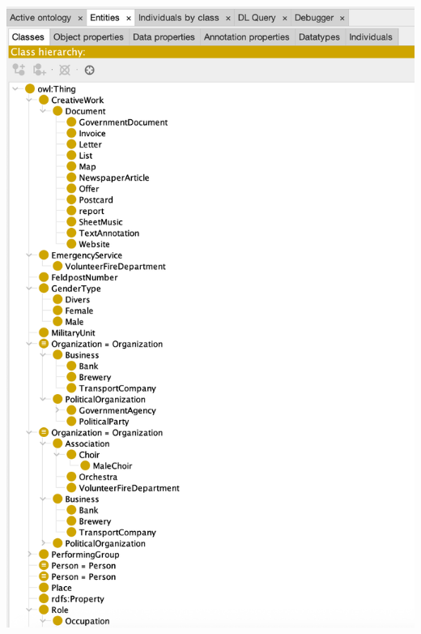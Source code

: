 \documentclass[12pt, a4paper, ngerman, bidi=default]{article}
\begin{document}
  \begin{minipage}[t]{0.43\textwidth}
    \centering
    \vspace*{0.3cm} %
    \includegraphics[width=\linewidth]{assets/Images/Bildschirmfoto_ttl_ontologie_Ausschnitt.png}
    \label{fig:ttl-ontologie}
\end{minipage}

\vspace{1em}
\end{document}
